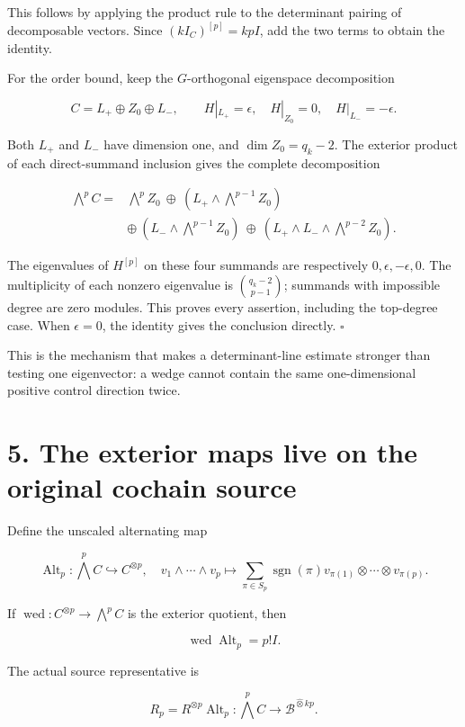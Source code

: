 \documentclass[
  11pt,
]{article}
\begin{document}
This follows by applying the product rule to the determinant pairing of
decomposable vectors. Since \((kI_C)^{[p]}=kpI\), add the two terms to
obtain the identity.

For the order bound, keep the \(G\)-orthogonal eigenspace decomposition

\[
C=L_+\oplus Z_0\oplus L_-,
\qquad H|_{L_+}=\epsilon,\quad H|_{Z_0}=0,\quad H|_{L_-}=-\epsilon.
\]

Both \(L_+\) and \(L_-\) have dimension one, and \(\dim Z_0=q_k-2\). The
exterior product of each direct-summand inclusion gives the complete
decomposition

\[
\begin{aligned}
\bigwedge^p C={}&\bigwedge^p Z_0
\ \oplus\ (L_+\wedge\bigwedge^{p-1}Z_0)\\
&\oplus\ (L_-\wedge\bigwedge^{p-1}Z_0)
\ \oplus\ (L_+\wedge L_-\wedge\bigwedge^{p-2}Z_0).
\end{aligned}
\]

The eigenvalues of \(H^{[p]}\) on these four summands are respectively
\(0,\epsilon,-\epsilon,0\). The multiplicity of each nonzero eigenvalue
is \(\binom{q_k-2}{p-1}\); summands with impossible degree are zero
modules. This proves every assertion, including the top-degree case.
When \(\epsilon=0\), the identity gives the conclusion directly.
\(\square\)

This is the mechanism that makes a determinant-line estimate stronger
than testing one eigenvector: a wedge cannot contain the same
one-dimensional positive control direction twice.

\section{5. The exterior maps live on the original cochain
source}\label{the-exterior-maps-live-on-the-original-cochain-source}

Define the unscaled alternating map

\[
\operatorname{Alt}_p:\bigwedge^p C\hookrightarrow C^{\otimes p},
\quad
v_1\wedge\cdots\wedge v_p\mapsto
\sum_{\pi\in S_p}\operatorname{sgn}(\pi)
 v_{\pi(1)}\otimes\cdots\otimes v_{\pi(p)}.
\]

If \(\operatorname{wed}:C^{\otimes p}\to\bigwedge^p C\) is the exterior
quotient, then

\[
\operatorname{wed}\operatorname{Alt}_p=p!I.
\]

The actual source representative is

\[
\boxed{
R_p=R^{\otimes p}\operatorname{Alt}_p:
\bigwedge^p C\longrightarrow\mathscr B^{\widehat\otimes kp}.
}
\]
\end{document}
